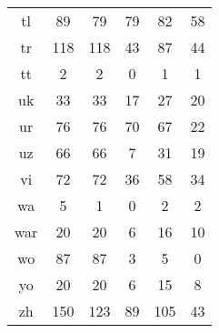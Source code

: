 \begin{figure}[h]
\begin{tabular}{cccccc}
tl&89&79&79&82&58\\
tr&118&118&43&87&44\\
tt&2&2&0&1&1\\
uk&33&33&17&27&20\\
ur&76&76&70&67&22\\
uz&66&66&7&31&19\\
vi&72&72&36&58&34\\
wa&5&1&0&2&2\\
war&20&20&6&16&10\\
wo&87&87&3&5&0\\
yo&20&20&6&15&8\\
zh&150&123&89&105&43\\
\hline\hline
\end{tabular}
\end{figure}
